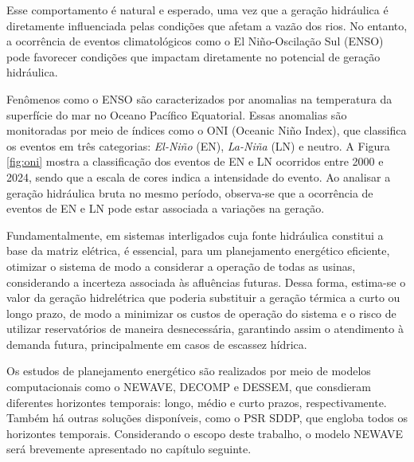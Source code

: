 \begin{figure}[!ht]
	{}
	{}
\end{figure}

Esse comportamento é natural e esperado, uma vez que a geração hidráulica é diretamente influenciada pelas condições
que afetam a vazão dos rios. No entanto, a ocorrência de eventos climatológicos como o El Niño-Oscilação Sul (ENSO) pode
favorecer condições que impactam diretamente no potencial de geração hidráulica. \cite{de2012influencia}

Fenômenos como o ENSO são caracterizados por anomalias na temperatura da superfície do mar no Oceano Pacífico
Equatorial. Essas anomalias são monitoradas por meio de índices como o ONI (Oceanic Niño Index), que classifica os 
eventos em três categorias: \textit{El-Niño} (EN), \textit{La-Niña} (LN) e neutro. A Figura \ref{fig:oni} mostra a 
classificação dos eventos de EN e LN ocorridos entre 2000 e 2024, sendo que a escala de cores indica a intensidade do 
evento. Ao analisar a geração hidráulica bruta no mesmo período, observa-se que a ocorrência de eventos de EN e LN 
pode estar associada a variações na geração.

\begin{figure}[!ht]
	{}
	{}
\end{figure}

Fundamentalmente, em sistemas interligados cuja fonte hidráulica constitui a base da matriz elétrica, é essencial, 
para um planejamento energético eficiente, otimizar o sistema de modo a considerar a operação de todas as usinas, 
considerando a incerteza associada às afluências futuras. Dessa forma, estima-se o valor da geração hidrelétrica que 
poderia substituir a geração térmica a curto ou longo prazo, de modo a minimizar os custos de operação do sistema e o 
risco de utilizar reservatórios de maneira desnecessária, garantindo assim o atendimento à demanda futura, 
principalmente em casos de escassez hídrica.

Os estudos de planejamento energético são realizados por meio de modelos computacionais como o NEWAVE, DECOMP e DESSEM, 
que consdieram diferentes horizontes temporais: longo, médio e curto prazos, respectivamente. Também há outras soluções 
disponíveis, como o PSR SDDP, que engloba todos os horizontes temporais. Considerando o escopo deste trabalho, o modelo 
NEWAVE será brevemente apresentado no capítulo seguinte.

